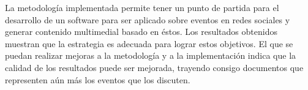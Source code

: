 La metodología implementada permite tener un punto de partida para el
desarrollo de un software para ser aplicado sobre eventos en redes
sociales y generar contenido multimedial basado en éstos. Los
resultados obtenidos muestran que la estrategia es adecuada para
lograr estos objetivos. El que se puedan realizar mejoras a la
metodología y a la implementación indica que la calidad de los
resultados puede ser mejorada, trayendo consigo documentos que
representen aún más los eventos que los discuten.